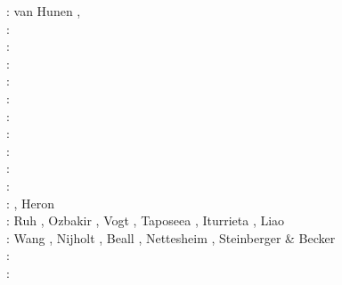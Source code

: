 \begin{scriptsize}
\twothousandfive: van Hunen \etal \cite{vazs05}, \cite{hagu05}\cite{wiwg05}\cite{mcjp05}\\
\twothousandsix: \cite{bube06}\cite{basv06}\cite{kasc06}\cite{fuwb06}\cite{colm06}\cite{pabs06}\cite{crnp06} \cite{sahm06}\\
\twothousandseven: \cite{afrf07}\cite{kore07}\cite{gewm07}\cite{jabn07}\\
\twothousandeight: \cite{affr08}\cite{tibb08}\cite{hapo08}\cite{busc08}\cite{clbz08}\cite{chlg08}
      \cite{kasb08}\cite{fabs08}\cite{chgu08}\cite{buit08}\cite{onlg08}\\
\twothousandnine: \cite{bupb09}\cite{plmg09}\cite{rigo09}\cite{bubg09}\cite{coco09}\\
\twothousandten: \cite{hamo10}\cite{fasm10}\cite{grpy10}\cite{vago10}\cite{plmf10}\cite{spgs10a}\cite{pygp10}
      \cite{jabw10}\\
\twothousandeleven: \cite{rera11}\cite{chss11}\\
\twothousandtwelve: \cite{wagw12}\cite{vacl12}\cite{buit12}\cite{kogp12}\cite{gohg12}\cite{trub12}\\
\twothousandthirteen: \cite{wazh13}\cite{krcu13}\cite{frbm13}\cite{wagw13}\cite{duyp13}\cite{rugb13} \cite{scdg13}\\
\twothousandfourteen: \cite{kava14}\cite{dusp14}\cite{wavp14}\cite{whbb14}\cite{scml14}
      \cite{mals14}\cite{gupm14}\cite{gahs14}\cite{mutg14}\\
\twothousandfifteen: \cite{wavp15}\cite{thkp15}\cite{mags15}\cite{duys15}\cite{dusp15}\\
\twothousandsixteen: \cite{wahz16}, Heron \etal \cite{heps16}\\
\twothousandseventeen: Ruh \etal \cite{rugb17}, Ozbakir \etal \cite{ozgw17},
                       Vogt \etal \cite{vomc17}, Taposeea \etal \cite{taac17}, 
                       Iturrieta \etal \cite{ithc17}, Liao \etal \cite{liwg17}\\
\twothousandeighteen: Wang \etal \cite{wavp18}, Nijholt \etal \cite{nigw18}, 
                      Beall \etal \cite{bemc18}, Nettesheim \etal \cite{neew18}, 
                      Steinberger \& Becker \cite{stbe18}\\
\twothousandnineteen: \cite{koen19}\cite{kipd19}\cite{crcm19}\cite{pedm19}\cite{mazz19}\cite{chch19}\\
\twothousandtwenty: \cite{yamq20}
\end{scriptsize}


